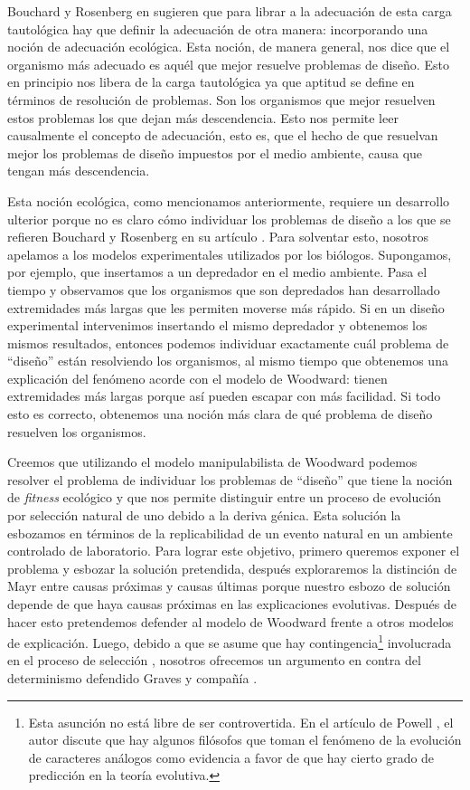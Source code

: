 Bouchard y Rosenberg en \cite{Bouchard2004} sugieren que para librar a la adecuación de esta carga tautológica hay que definir la adecuación de otra manera: incorporando una noción de adecuación ecológica. Esta noción, de manera general, nos dice que el organismo más adecuado es aquél que mejor resuelve problemas de diseño. Esto en principio nos libera de la carga tautológica ya que aptitud se define en términos de resolución de problemas. Son los organismos que mejor resuelven estos problemas los que dejan más descendencia. Esto nos permite leer causalmente el concepto de adecuación, esto es, que el hecho de que resuelvan mejor los problemas de diseño impuestos por el medio ambiente, causa que tengan más descendencia.

Esta noción ecológica, como mencionamos anteriormente, requiere un desarrollo ulterior porque no es claro cómo individuar los problemas de diseño a los que se refieren Bouchard y Rosenberg en su artículo \citeyear{Bouchard2004}. Para solventar esto, nosotros apelamos a los modelos experimentales utilizados por los biólogos. Supongamos, por ejemplo, que insertamos a un depredador en el medio ambiente. Pasa el tiempo y observamos que los organismos que son depredados han desarrollado extremidades más largas que les permiten moverse más rápido. Si en un diseño experimental intervenimos insertando el mismo depredador y obtenemos los mismos resultados, entonces podemos individuar exactamente cuál problema de ``diseño'' están resolviendo los organismos, al mismo tiempo que obtenemos una explicación del fenómeno acorde con el modelo de Woodward: tienen extremidades más largas porque así pueden escapar con más facilidad. Si todo esto es correcto, obtenemos una noción más clara de qué problema de diseño resuelven los organismos.

Creemos que utilizando el modelo manipulabilista de Woodward podemos resolver el problema de individuar los problemas de ``diseño''  que tiene la noción de \emph{fitness} ecológico \cite{Bouchard2004, sep-fitness} y que nos permite distinguir entre un proceso de evolución por selección natural de uno debido a la deriva génica. Esta solución la esbozamos en términos de la replicabilidad de un evento natural en un ambiente controlado de laboratorio. Para lograr este objetivo, primero queremos exponer el problema y esbozar la solución pretendida, después exploraremos la distinción de Mayr entre causas próximas y causas últimas porque nuestro esbozo de solución depende de que haya causas próximas en las explicaciones evolutivas. Después de hacer esto pretendemos defender al modelo de Woodward frente a otros modelos de explicación. Luego, debido a que se asume que hay contingencia\footnote{Esta asunción no está libre de ser controvertida. En el artículo de Powell \citeyear{Powell2012}, el autor discute que hay algunos filósofos que toman el fenómeno de la evolución de caracteres análogos como evidencia a favor de que hay cierto grado de predicción en la teoría evolutiva.} involucrada en el proceso de selección \cite{Scriven1959, Mayr1998}, nosotros ofrecemos un argumento en contra del determinismo defendido Graves y compañía \cite{Graves1999}.

